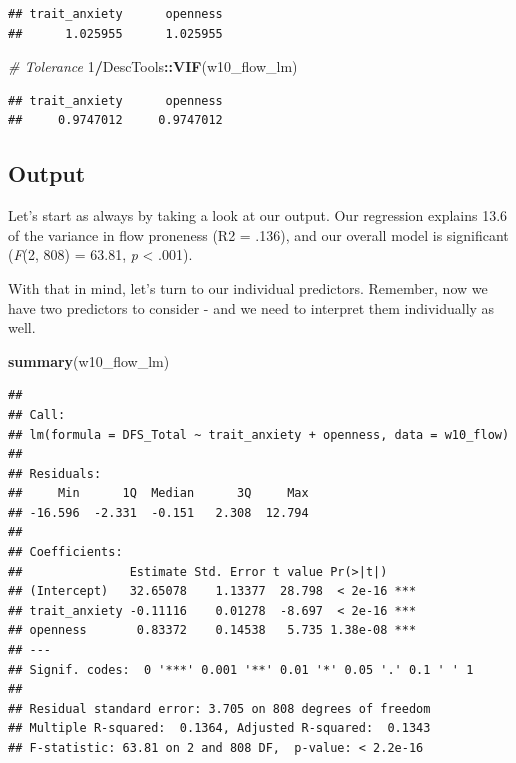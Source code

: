 \documentclass[
]{book}
\newenvironment{Shaded}{\begin{snugshade}}{\end{snugshade}}
\newcommand{\CommentTok}[1]{\textcolor[rgb]{0.56,0.35,0.01}{\textit{#1}}}
\newcommand{\DecValTok}[1]{\textcolor[rgb]{0.00,0.00,0.81}{#1}}
\newcommand{\FunctionTok}[1]{\textcolor[rgb]{0.13,0.29,0.53}{\textbf{#1}}}
\newcommand{\NormalTok}[1]{#1}
\newcommand{\SpecialCharTok}[1]{\textcolor[rgb]{0.81,0.36,0.00}{\textbf{#1}}}
\begin{document}
\begin{verbatim}
## trait_anxiety      openness 
##      1.025955      1.025955
\end{verbatim}

\begin{Shaded}
\begin{Highlighting}[]
\CommentTok{\# Tolerance}
\DecValTok{1}\SpecialCharTok{/}\NormalTok{DescTools}\SpecialCharTok{::}\FunctionTok{VIF}\NormalTok{(w10\_flow\_lm)}
\end{Highlighting}
\end{Shaded}

\begin{verbatim}
## trait_anxiety      openness 
##     0.9747012     0.9747012
\end{verbatim}

\subsection{Output}\label{output-6}

Let's start as always by taking a look at our output. Our regression explains 13.6 of the variance in flow proneness (R2 = .136), and our overall model is significant (\emph{F}(2, 808) = 63.81, \emph{p} \textless{} .001).

With that in mind, let's turn to our individual predictors. Remember, now we have two predictors to consider - and we need to interpret them individually as well.

\begin{Shaded}
\begin{Highlighting}[]
\FunctionTok{summary}\NormalTok{(w10\_flow\_lm)}
\end{Highlighting}
\end{Shaded}

\begin{verbatim}
## 
## Call:
## lm(formula = DFS_Total ~ trait_anxiety + openness, data = w10_flow)
## 
## Residuals:
##     Min      1Q  Median      3Q     Max 
## -16.596  -2.331  -0.151   2.308  12.794 
## 
## Coefficients:
##               Estimate Std. Error t value Pr(>|t|)    
## (Intercept)   32.65078    1.13377  28.798  < 2e-16 ***
## trait_anxiety -0.11116    0.01278  -8.697  < 2e-16 ***
## openness       0.83372    0.14538   5.735 1.38e-08 ***
## ---
## Signif. codes:  0 '***' 0.001 '**' 0.01 '*' 0.05 '.' 0.1 ' ' 1
## 
## Residual standard error: 3.705 on 808 degrees of freedom
## Multiple R-squared:  0.1364, Adjusted R-squared:  0.1343 
## F-statistic: 63.81 on 2 and 808 DF,  p-value: < 2.2e-16
\end{verbatim}
\end{document}
